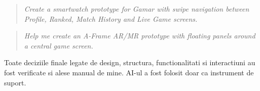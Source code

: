 \documentclass[12pt,a4paper]{article}
\begin{document}
\begin{quote}
\textit{Create a smartwatch prototype for Gamar with swipe navigation between Profile, Ranked, Match History and Live Game screens.}
\end{quote}

\begin{quote}
\textit{Help me create an A-Frame AR/MR prototype with floating panels around a central game screen.}
\end{quote}

Toate deciziile finale legate de design, structura, functionalitati si interactiuni au fost verificate si alese manual de mine. AI-ul a fost folosit doar ca instrument de suport.
\end{document}
